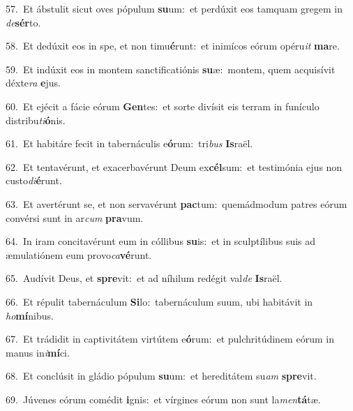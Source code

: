 {\numbfont\textcolor{\numbcolor}{57.}}~Et ábstulit sicut oves pópulum \textbf{su}\-um:~\star et perdúxit eos tamquam gregem in \textit{de}\-\textbf{sér}to.\par
{\numbfont\textcolor{\numbcolor}{58.}}~Et dedúxit eos in spe, et non timu\-\textbf{é}\-runt:~\star et inimícos eórum opéru\textit{it} \textbf{ma}\-re.\par
{\numbfont\textcolor{\numbcolor}{59.}}~Et indúxit eos in montem sanctificatiónis \textbf{su}\-æ:~\star montem, quem acquisívit déxte\textit{ra} \textbf{e}\-jus.\par
{\numbfont\textcolor{\numbcolor}{60.}}~Et ejécit a fácie eórum \textbf{Gen}\-tes:~\star et sorte divísit eis terram in funículo distribu\-\textit{ti}\-\textbf{ó}nis.\par
{\numbfont\textcolor{\numbcolor}{61.}}~Et habitáre fecit in tabernáculis e\-\textbf{ó}\-rum:~\star tri\textit{bus} \textbf{Is}\-raël.\par
{\numbfont\textcolor{\numbcolor}{62.}}~Et tentavérunt, et exacerbavérunt Deum ex\-\textbf{cél}\-sum:~\star et testimónia ejus non custo\-\textit{di}\-\textbf{é}runt.\par
{\numbfont\textcolor{\numbcolor}{63.}}~Et avertérunt se, et non servavérunt \textbf{pac}\-tum:~\star quemádmodum patres eórum convérsi sunt in ar\textit{cum} \textbf{pra}\-vum.\par
{\numbfont\textcolor{\numbcolor}{64.}}~In iram concitavérunt eum in cóllibus \textbf{su}\-is:~\star et in sculptílibus suis ad æmulatiónem eum provo\-\textit{ca}\-\textbf{vé}runt.\par
{\numbfont\textcolor{\numbcolor}{65.}}~Audívit Deus, et \textbf{spre}\-vit:~\star et ad níhilum redégit val\textit{de} \textbf{Is}\-raël.\par
{\numbfont\textcolor{\numbcolor}{66.}}~Et répulit tabernáculum \textbf{Si}\-lo:~\star tabernáculum suum, ubi habitávit in \textit{ho}\-\textbf{mí}nibus.\par
{\numbfont\textcolor{\numbcolor}{67.}}~Et trádidit in captivitátem virtútem e\-\textbf{ó}\-rum:~\star et pulchritúdinem eórum in manus in\-\textit{i}\-\textbf{mí}ci.\par
{\numbfont\textcolor{\numbcolor}{68.}}~Et conclúsit in gládio pópulum \textbf{su}\-um:~\star et hereditátem su\textit{am} \textbf{spre}\-vit.\par
{\numbfont\textcolor{\numbcolor}{69.}}~Júvenes eórum comédit \textbf{i}\-gnis:~\star et vírgines eórum non sunt la\-\textit{men}\-\textbf{tá}tæ.\par
